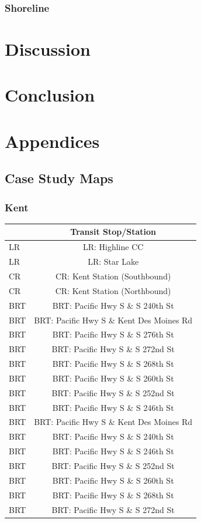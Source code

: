 \documentclass[
]{agujournal2019}
\begin{document}
\subsubsection{Shoreline}\label{shoreline}

\section{Discussion}\label{discussion}

\section{Conclusion}\label{conclusion}

\section*{Appendices}\label{appendices}

\subsection{Case Study Maps}\label{case-study-maps}

\subsubsection{Kent}\label{kent-1}

\begin{longtable*}{l|c}
\toprule
{} & Transit Stop/Station \\ 
\midrule
LR & LR: Highline CC \\ 
LR & LR: Star Lake \\ 
CR & CR: Kent Station (Southbound) \\ 
CR & CR: Kent Station (Northbound) \\ 
BRT & BRT: Pacific Hwy S \& S 240th St \\ 
BRT & BRT: Pacific Hwy S \& Kent Des Moines Rd \\ 
BRT & BRT: Pacific Hwy S \& S 276th St \\ 
BRT & BRT: Pacific Hwy S \& S 272nd St \\ 
BRT & BRT: Pacific Hwy S \& S 268th St \\ 
BRT & BRT: Pacific Hwy S \& S 260th St \\ 
BRT & BRT: Pacific Hwy S \& S 252nd St \\ 
BRT & BRT: Pacific Hwy S \& S 246th St \\ 
BRT & BRT: Pacific Hwy S \& Kent Des Moines Rd \\ 
BRT & BRT: Pacific Hwy S \& S 240th St \\ 
BRT & BRT: Pacific Hwy S \& S 246th St \\ 
BRT & BRT: Pacific Hwy S \& S 252nd St \\ 
BRT & BRT: Pacific Hwy S \& S 260th St \\ 
BRT & BRT: Pacific Hwy S \& S 268th St \\ 
BRT & BRT: Pacific Hwy S \& S 272nd St \\ 
\bottomrule
\end{longtable*}
\end{document}
